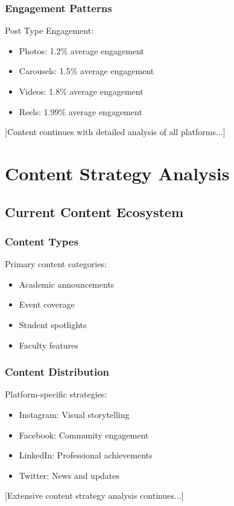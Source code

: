 \documentclass[12pt]{report}
\begin{document}
\subsection{Engagement Patterns}
Post Type Engagement:
\begin{itemize}
    \item Photos: 1.2\% average engagement
    \item Carousels: 1.5\% average engagement
    \item Videos: 1.8\% average engagement
    \item Reels: 1.99\% average engagement
\end{itemize}

[Content continues with detailed analysis of all platforms...]

\chapter{Content Strategy Analysis}

\section{Current Content Ecosystem}
\subsection{Content Types}
Primary content categories:
\begin{itemize}
    \item Academic announcements
    \item Event coverage
    \item Student spotlights
    \item Faculty features
\end{itemize}

\subsection{Content Distribution}
Platform-specific strategies:
\begin{itemize}
    \item Instagram: Visual storytelling
    \item Facebook: Community engagement
    \item LinkedIn: Professional achievements
    \item Twitter: News and updates
\end{itemize}

[Extensive content strategy analysis continues...]
\end{document}
